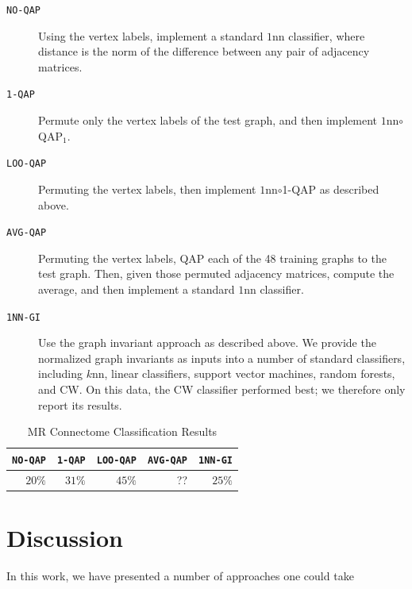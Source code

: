 \documentclass{article} %
\begin{document}
\begin{description}
	\item[\texttt{NO-QAP}] Using the vertex labels, implement a standard $1$nn classifier, where distance is the norm of the difference between any pair of adjacency matrices.
	\item[\texttt{1-QAP}] Permute only the vertex labels of the test graph, and then implement $1$nn$\circ$QAP$_1$.
	\item[\texttt{LOO-QAP}] Permuting the vertex labels, then implement $1$nn$\circ$1-QAP as described above.
	\item[\texttt{AVG-QAP}] Permuting the vertex labels, QAP each of the 48 training graphs to the test graph.  Then, given those permuted adjacency matrices, compute the average, and then implement a standard $1$nn classifier.
	\item[\texttt{1NN-GI}] Use the graph invariant approach as described above. We provide the normalized graph invariants as inputs into a number of standard classifiers, including $k$nn, linear classifiers, support vector machines, random forests, and CW. On this data, the CW classifier performed best; we therefore only report its results.
\end{description}


\begin{table}[h!]
\caption{MR Connectome Classification Results}
\begin{center}
\begin{tabular}{|r|r|r|r|r|}
\hline
\texttt{NO-QAP} & \texttt{1-QAP} & \texttt{LOO-QAP} & \texttt{AVG-QAP} & \texttt{1NN-GI}\\
\hline
$20\%$ & $31\%$ & $45\%$ & ?? & $25\%$ \\
    \hline
\end{tabular}
\end{center}
\label{tab:fwpath}
\end{table}%


\section{Discussion}


In this work, we have presented a number of approaches one could take \cite{VogelsteinPaninski09}



% 
\end{document}
